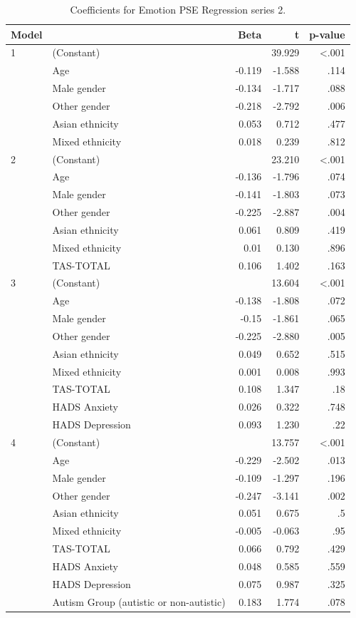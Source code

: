 \documentclass[
]{article}
\begin{document}
\begin{table}[H]

\caption{\label{tab:table6}Coefficients for Emotion PSE Regression series 2.}
\centering
\begin{tabular}[t]{llrrr}
\toprule
Model &  & Beta & t & p-value\\
\midrule
1 & (Constant) &  & 39.929 & <.001\\
 & Age & -0.119 & -1.588 & .114\\
 & Male gender & -0.134 & -1.717 & .088\\
 & Other gender & -0.218 & -2.792 & .006\\
 & Asian ethnicity & 0.053 & 0.712 & .477\\
\addlinespace
 & Mixed ethnicity & 0.018 & 0.239 & .812\\
2 & (Constant) &  & 23.210 & <.001\\
 & Age & -0.136 & -1.796 & .074\\
 & Male gender & -0.141 & -1.803 & .073\\
 & Other gender & -0.225 & -2.887 & .004\\
\addlinespace
 & Asian ethnicity & 0.061 & 0.809 & .419\\
 & Mixed ethnicity & 0.01 & 0.130 & .896\\
 & TAS-TOTAL & 0.106 & 1.402 & .163\\
3 & (Constant) &  & 13.604 & <.001\\
 & Age & -0.138 & -1.808 & .072\\
\addlinespace
 & Male gender & -0.15 & -1.861 & .065\\
 & Other gender & -0.225 & -2.880 & .005\\
 & Asian ethnicity & 0.049 & 0.652 & .515\\
 & Mixed ethnicity & 0.001 & 0.008 & .993\\
 & TAS-TOTAL & 0.108 & 1.347 & .18\\
\addlinespace
 & HADS Anxiety & 0.026 & 0.322 & .748\\
 & HADS Depression & 0.093 & 1.230 & .22\\
4 & (Constant) &  & 13.757 & <.001\\
 & Age & -0.229 & -2.502 & .013\\
 & Male gender & -0.109 & -1.297 & .196\\
\addlinespace
 & Other gender & -0.247 & -3.141 & .002\\
 & Asian ethnicity & 0.051 & 0.675 & .5\\
 & Mixed ethnicity & -0.005 & -0.063 & .95\\
 & TAS-TOTAL & 0.066 & 0.792 & .429\\
 & HADS Anxiety & 0.048 & 0.585 & .559\\
\addlinespace
 & HADS Depression & 0.075 & 0.987 & .325\\
 & Autism Group (autistic or non-autistic) & 0.183 & 1.774 & .078\\
\bottomrule
\end{tabular}
\end{table}
\end{document}
